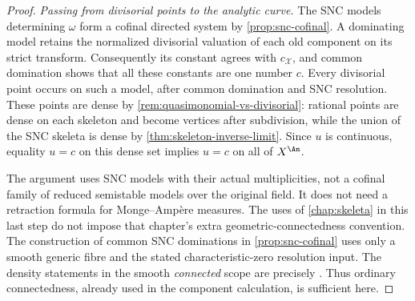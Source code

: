 \begin{proof}
\emph{Passing from divisorial points to the analytic curve.}
The SNC models determining \(\omega\) form a cofinal directed system
by \cref{prop:snc-cofinal}.  A dominating model retains the normalized
divisorial valuation of each old component on its strict transform.
Consequently its constant agrees with \(c_{\mathcal X}\), and common
domination shows that all these constants are one number \(c\).
Every divisorial point occurs on such a model, after common domination
and SNC resolution.  These points are dense by
\cref{rem:quasimonomial-vs-divisorial}: rational points are dense on each
skeleton and become vertices after subdivision, while the union of the
SNC skeleta is dense by \cref{thm:skeleton-inverse-limit}.
Since \(u\) is continuous, equality \(u=c\) on this dense set implies
\(u=c\) on all of \(X^{\An}\).

The argument uses SNC models with their actual multiplicities, not a
cofinal family of reduced semistable models over the original field.
It does not need a retraction formula for Monge--Amp\`ere measures.
The uses of \cref{chap:skeleta} in this last step do not impose that
chapter's extra geometric-connectedness convention.  The construction
of common SNC dominations in \cref{prop:snc-cofinal} uses only a
smooth generic fibre and the stated characteristic-zero resolution
input.  The density statements in the smooth \emph{connected} scope
are precisely \cite[\S2.4, Corollaries~2.4, 3.2 and 3.17]{BFJ16}.
Thus ordinary connectedness, already used in the component calculation,
is sufficient here.
\end{proof}
